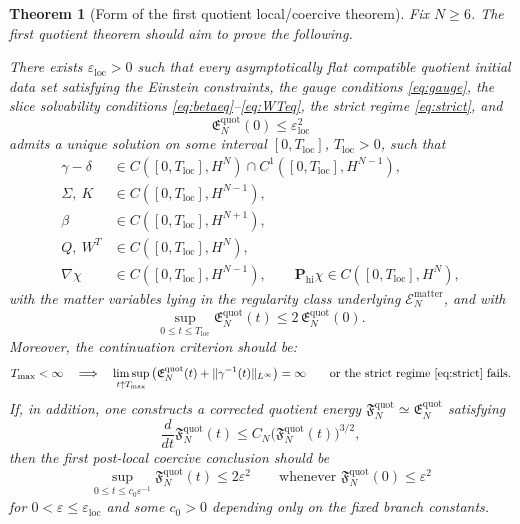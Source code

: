 \documentclass[11pt]{article}
\newtheorem{theorem}{Theorem}
\begin{document}
\begin{theorem}[Form of the first quotient local/coercive theorem]
\label{thm:form}
Fix \(N\ge 6\). The first quotient theorem should aim to prove the following.

There exists \(\varepsilon_{\mathrm{loc}}>0\) such that every asymptotically flat compatible quotient initial data set satisfying the Einstein constraints, the gauge conditions \eqref{eq:gauge}, the slice solvability conditions \eqref{eq:betaeq}--\eqref{eq:WTeq}, the strict regime \eqref{eq:strict}, and
\begin{equation}
\mathfrak E_N^{\mathrm{quot}}(0)\le \varepsilon_{\mathrm{loc}}^2
\label{eq:smalllocal}
\end{equation}
admits a unique solution on some interval \([0,T_{\mathrm{loc}}]\), \(T_{\mathrm{loc}}>0\), such that
\begin{align}
\gamma-\delta &\in C([0,T_{\mathrm{loc}}],H^N)\cap C^1([0,T_{\mathrm{loc}}],H^{N-1}),
\label{eq:reggamma}
\\
\Sigma,\ K &\in C([0,T_{\mathrm{loc}}],H^{N-1}),
\label{eq:regSigma}
\\
\beta &\in C([0,T_{\mathrm{loc}}],H^{N+1}),
\label{eq:regbeta}
\\
Q,\ W^T &\in C([0,T_{\mathrm{loc}}],H^N),
\label{eq:regaux}
\\
\nabla\chi &\in C([0,T_{\mathrm{loc}}],H^{N-1}),
\qquad
\mathbf P_{\mathrm{hi}}\chi\in C([0,T_{\mathrm{loc}}],H^N),
\label{eq:regchi}
\end{align}
with the matter variables lying in the regularity class underlying \(\mathcal E_N^{\mathrm{matter}}\), and with
\begin{equation}
\sup_{0\le t\le T_{\mathrm{loc}}}\mathfrak E_N^{\mathrm{quot}}(t)
\le
2\,\mathfrak E_N^{\mathrm{quot}}(0).
\label{eq:localbound}
\end{equation}
Moreover, the continuation criterion should be:
\begin{equation}
T_{\max}<\infty
\quad\Longrightarrow\quad
\limsup_{t\uparrow T_{\max}}
\left(
\mathfrak E_N^{\mathrm{quot}}(t)
+\|\gamma^{-1}(t)\|_{L^\infty}
\right)
=\infty
\qquad
\text{or the strict regime \eqref{eq:strict} fails.}
\label{eq:continuation}
\end{equation}
If, in addition, one constructs a corrected quotient energy \(\mathfrak F_N^{\mathrm{quot}}\simeq \mathfrak E_N^{\mathrm{quot}}\) satisfying
\begin{equation}
\frac{d}{dt}\mathfrak F_N^{\mathrm{quot}}(t)
\le
C_N\bigl(\mathfrak F_N^{\mathrm{quot}}(t)\bigr)^{3/2},
\label{eq:coerciveineq}
\end{equation}
then the first post-local coercive conclusion should be
\begin{equation}
\sup_{0\le t\le c_0\varepsilon^{-1}}\mathfrak F_N^{\mathrm{quot}}(t)
\le
2\varepsilon^2
\qquad
\text{whenever }
\mathfrak F_N^{\mathrm{quot}}(0)\le \varepsilon^2
\label{eq:coercivetarget}
\end{equation}
for \(0<\varepsilon\le \varepsilon_{\mathrm{loc}}\) and some \(c_0>0\) depending only on the fixed branch constants.
\end{theorem}
\end{document}
